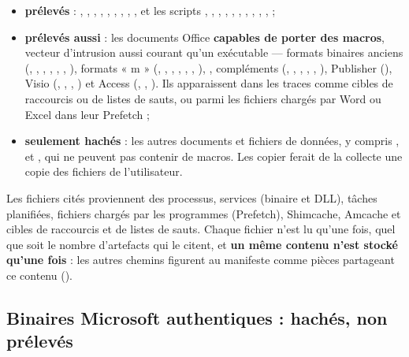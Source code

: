 \documentclass[11pt,a4paper,oneside]{report}
\begin{document}
\begin{itemize}
  \item \textbf{prélevés} : , , ,
        , , , ,
        , ,  et les scripts
        , , , ,
        , , , ,
        , ,  ;
  \item \textbf{prélevés aussi} : les documents Office \textbf{capables de porter
        des macros}, vecteur d'intrusion aussi courant qu'un exécutable —
        formats binaires anciens (, , ,
        , , , ), formats
        « m » (, , , ,
        , , ), ,
        compléments (, , ,
        , , ), Publisher
        (), Visio (, , ,
        ) et Access (, ,
        ). Ils apparaissent dans les traces comme cibles de
        raccourcis ou de listes de sauts, ou parmi les fichiers chargés par
        Word ou Excel dans leur Prefetch ;
  \item \textbf{seulement hachés} : les autres documents et fichiers de données,
        y compris ,  et , qui ne
        peuvent pas contenir de macros. Les copier ferait de la collecte une
        copie des fichiers de l'utilisateur.
\end{itemize}

Les fichiers cités proviennent des processus, services (binaire et DLL), tâches
planifiées, fichiers chargés par les programmes (Prefetch), Shimcache, Amcache et
cibles de raccourcis et de listes de sauts. Chaque fichier n'est lu qu'une fois, quel que soit le
nombre d'artefacts qui le citent, et \textbf{un même contenu n'est stocké
qu'une fois} : les autres chemins figurent au manifeste comme pièces partageant
ce contenu ().

\subsection*{Binaires Microsoft authentiques : hachés, non prélevés}
\end{document}
